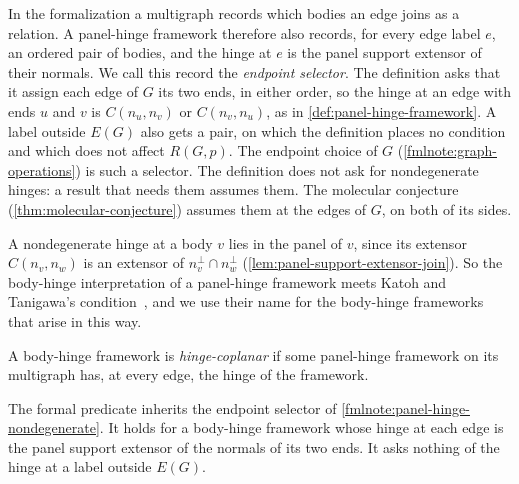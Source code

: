 \begin{fmlnote}
  \label{fmlnote:panel-hinge-nondegenerate}
  In the formalization a multigraph records which bodies an edge joins as
  a relation. A panel-hinge framework therefore also records, for every
  edge label $e$, an ordered pair of bodies, and the hinge at $e$ is the
  panel support extensor of their normals. We call this record the
  \emph{endpoint selector}. The definition asks that it assign each edge
  of $G$ its two ends, in either order, so the hinge at an edge with ends
  $u$ and $v$ is $C(n_u, n_v)$ or $C(n_v, n_u)$, as in
  \cref{def:panel-hinge-framework}. A label outside $E(G)$ also gets a
  pair, on which the definition places no condition and which does not
  affect $R(G,p)$. The endpoint choice of $G$
  (\cref{fmlnote:graph-operations}) is such a selector. The definition
  does not ask for nondegenerate hinges: a result that needs them assumes
  them. The molecular conjecture (\cref{thm:molecular-conjecture})
  assumes them at the edges of $G$, on both of its sides.
\end{fmlnote}

A nondegenerate hinge at a body $v$ lies in the panel of $v$, since its
extensor $C(n_v, n_w)$ is an extensor of $n_v^\perp \cap n_w^\perp$
(\cref{lem:panel-support-extensor-join}). So
the body-hinge interpretation of a panel-hinge framework meets Katoh and
Tanigawa's condition~\cite[p.~648]{katohTanigawa2011}, and we use their
name for the body-hinge frameworks that arise in this way.

\begin{definition}
  \label{def:hinge-coplanar}
  \leanok
  A body-hinge framework is \emph{hinge-coplanar} if some panel-hinge
  framework on its multigraph has, at every edge, the hinge of the
  framework.
\end{definition}

\begin{fmlnote}
  The formal predicate inherits the endpoint selector of
  \cref{fmlnote:panel-hinge-nondegenerate}. It holds for a body-hinge
  framework whose hinge at each edge is the panel support extensor of the
  normals of its two ends. It asks nothing of the hinge at a label outside
  $E(G)$.
\end{fmlnote}

